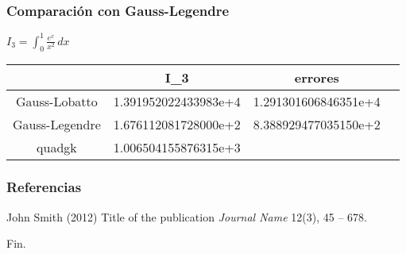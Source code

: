 \documentclass{beamer}
\begin{document}
\begin{frame}
\frametitle{Comparación con Gauss-Legendre}
\(\displaystyle I_3=\int_{0}^{1} \! \frac{e^x}{x^2}  \,dx\)

\begin{table}[h]

    \begin{tabular}{|c|c|c|c|}
        \hline
        \rowcolor{gray!30} %
         & I_3 & errores\\
        \hline
         Gauss-Lobatto &  1.391952022433983e+4 & 1.291301606846351e+4\\
        \hline
        Gauss-Legendre &  1.676112081728000e+2 & 8.388929477035150e+2\\
        \hline
        quadgk & 1.006504155876315e+3 &\\
        \hline
    \end{tabular}
    
    \label{tab:my_label}
\end{table}

\end{frame}
\begin{frame}
\frametitle{Referencias}
\footnotesize{
  \begin{thebibliography}{99} %
     John Smith (2012)
      \newblock Title of the publication
      \newblock \emph{Journal Name} 12(3), 45 -- 678.
  \end{thebibliography}
}
\end{frame}


\begin{frame}
\Huge{\centerline{Fin.}}
\end{frame}

\end{document}
